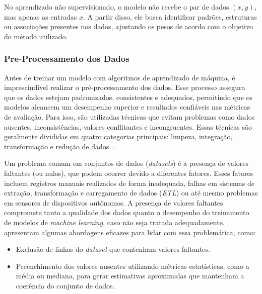             No aprendizado não supervisionado, o modelo não recebe o par de dados \((x,y)\), mas apenas as entradas 
            \(x\). A partir disso, ele busca identificar padrões, estruturas ou associações presentes nos dados, 
            ajustando os pesos de acordo com o objetivo do método utilizado.

        
        \subsubsection{Pre-Processamento dos Dados}
            Antes de treinar um modelo com algoritmos de aprendizado de máquina, é imprescindível realizar o pré-processamento 
            dos dados. Esse processo assegura que os dados estejam padronizados, consistentes e adequados, permitindo que os 
            modelos alcancem um desempenho superior e resultados confiáveis nas métricas de avaliação. Para isso, são utilizadas 
            técnicas que evitam problemas como dados ausentes, inconsistências, valores conflitantes e incongruentes. Essas 
            técnicas são geralmente divididas em quatro categorias principais: limpeza, integração, transformação e redução de 
            dados~\cite{silva2021, oliveira2024}.

                Um problema comum em conjuntos de dados (\emph{datasets}) é a presença de valores faltantes (ou nulos), que 
                podem ocorrer devido a diferentes fatores. Esses fatores incluem registros manuais realizados de forma 
                inadequada, falhas em sistemas de extração, transformação e carregamento de dados (\emph{ETL}) ou até mesmo 
                problemas em sensores de dispositivos autônomos. A presença de valores faltantes compromete tanto a qualidade 
                dos dados quanto o desempenho do treinamento de modelos de \emph{machine learning}, caso não seja tratada 
                adequadamente.~ apresentam algumas abordagens eficazes para lidar com essa 
                problemática, como:

                \begin{itemize}
                    \item Exclusão de linhas do \emph{dataset} que contenham valores faltantes.
                    \item Preenchimento dos valores ausentes utilizando métricas estatísticas, como a média ou mediana, 
                    para gerar estimativas aproximadas que mantenham a coerência do conjunto de dados.
                \end{itemize}
                
